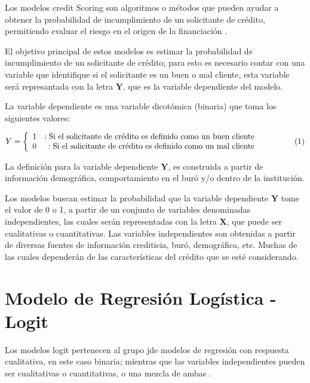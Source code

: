 \documentclass[
  letterpaper,
]{tex/svmono}
\begin{document}
Los modelos credit Scoring son algoritmos o métodos que pueden ayudar a
obtener la probabilidad de incumplimiento de un solicitante de crédito,
permitiendo evaluar el riesgo en el origen de la financiación
\citep{Gutierrez}.

El objetivo principal de estos modelos es estimar la probabilidad de
incumplimiento de un solicitante de crédito; para esto es necesario
contar con una variable que identifique si el solicitante es un buen o
mal cliente, esta variable será represantada con la letra
\(\textbf{Y}\), que es la variable dependiente del modelo.

La variable dependiente es una variable dicotómica (binaria) que toma
los siguientes valores:

\[
Y = \left \{
\begin{array}{rr}
1 &: \mbox{Si el solicitante de crédito es definido como un buen cliente}\\
0 &: \mbox{Si el solicitante de crédito es definido como un mal cliente}\\
\end{array}
\right. \hspace{1.5cm} (1)
\]

La definición para la variable dependiente \(\textbf{Y}\), es construida
a partir de información demográfica, comportamiento en el buró y/o
dentro de la institución.

Los modelos buscan estimar la probabilidad que la variable dependiente
\(\textbf{Y}\) tome el valor de 0 o 1, a partir de un conjunto de
variables denominadas independientes, las cuales serán representadas con
la letra \(\textbf{X}\), que puede ser cualitativas o cuantitativas. Las
variables independientes son obtenidas a partir de diversas fuentes de
información crediticia, buró, demográfica, etc. Muchas de las cuales
dependerán de las características del crédito que se esté considerando.

\hypertarget{modelo-de-regresiuxf3n-loguxedstica---logit}{%
\section{Modelo de Regresión Logística -
Logit}\label{modelo-de-regresiuxf3n-loguxedstica---logit}}

Los modelos logit pertenecen al grupo jde modelos de regresión con
respuesta cualitativa, en este caso binaria; mientras que las variables
independientes pueden ser cualitativas o cuantitativas, o una mezcla de
ambas \citep{Flórez}.
\end{document}
